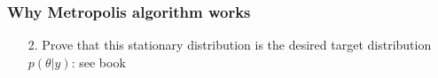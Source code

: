 \documentclass[10pt]{beamer}
\begin{document}
\begin{frame}

\frametitle{ Why Metropolis algorithm works}

  \begin{itemize}
  \item[2.] Prove that this stationary distribution is the desired target distribution $p(\theta|y)$: see book
  \end{itemize}

\end{frame}
\end{document}
